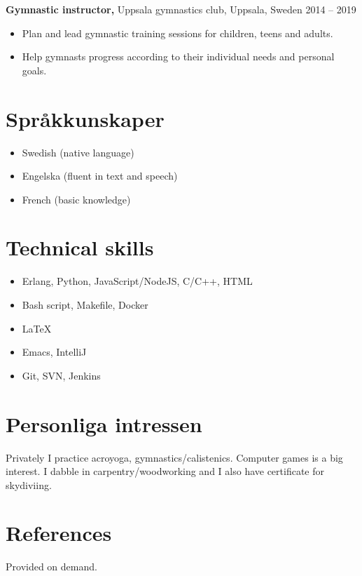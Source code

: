 \documentclass[margin]{res}
\begin{document}
\begin{resume}
{\bf Gymnastic instructor,} Uppsala gymnastics club, Uppsala, Sweden \hfill 2014 -- 2019
\begin{itemize} \itemsep -2pt
\item Plan and lead gymnastic training sessions for children, teens and adults.
\item Help gymnasts progress according to their individual needs and personal goals.
\end{itemize}

\section{Språkkunskaper}
\begin{itemize} \itemsep -2pt
\item Swedish (native language)
\item Engelska (fluent in text and speech)
\item French (basic knowledge)
\end{itemize}

\section{Technical skills}
\begin{itemize} \itemsep -2pt
\item Erlang, Python, JavaScript/NodeJS, C/C++, HTML
\item Bash script, Makefile, Docker
\item LaTeX
\item Emacs, IntelliJ
\item Git, SVN, Jenkins
\end{itemize}

\section{Personliga intressen}
Privately I practice acroyoga, gymnastics/calistenics. Computer games is a big interest. I dabble
in carpentry/woodworking and I also have certificate for skydiviing.

\section{References}
Provided on demand.

\end{resume}
\end{document}
